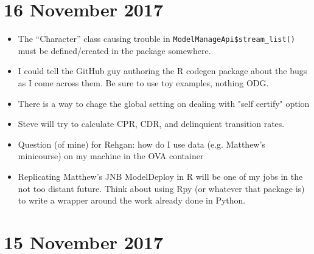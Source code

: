 \documentclass{article}
\begin{document}
\section*{16 November 2017}
\begin{itemize}
\item The ``Character'' class causing trouble in \verb|ModelManageApi$stream_list()| must be defined/created in the package somewhere.
\item I could tell the GitHub guy authoring the R codegen package about the bugs as I come across them. Be sure to use toy examples, nothing ODG.
\item There is a way to chage the global setting on dealing with "self certify" option
\item Steve will try to calculate CPR, CDR, and delinquient transition rates.
\item Question (of mine) for Rehgan: how do I use data (e.g. Matthew's minicourse) on my machine in the OVA container 
\item Replicating Matthew's JNB ModelDeploy in R will be one of my jobs in the not too distant future. Think about using Rpy (or whatever that package is) to write a wrapper around the work already done in Python.
\end{itemize}

\section*{15 November 2017}
\end{document}
